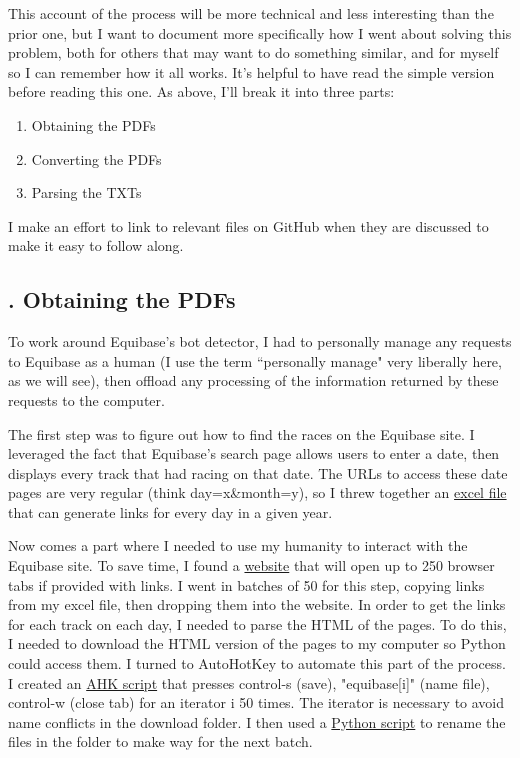 \documentclass{article}
\begin{document}
This account of the process will be more technical and less interesting than the prior one, but I want to document more specifically how I went about solving this problem, both for others that may want to do something similar, and for myself so I can remember how it all works. It's helpful to have read the simple version before reading this one. As above, I'll break it into three parts:

\begin{enumerate}
  \item Obtaining the PDFs
  \item Converting the PDFs
  \item Parsing the TXTs
\end{enumerate}

\noindent I make an effort to link to relevant files on GitHub when they are discussed to make it easy to follow along.

\subsection*{. Obtaining the PDFs}

To work around Equibase's bot detector, I had to personally manage any requests to Equibase as a human (I use the term ``personally manage" very liberally here, as we will see), then offload any processing of the information returned by these requests to the computer.

The first step was to figure out how to find the races on the Equibase site. I leveraged the fact that Equibase's search page allows users to enter a date, then displays every track that had racing on that date. The URLs to access these date pages are very regular (think day=x\&month=y), so I threw together an \href{https://github.com/Real-Karisch/horseData/blob/master/excel/generateDayLinks.xlsx}{excel file} that can generate links for every day in a given year.

Now comes a part where I needed to use my humanity to interact with the Equibase site. To save time, I found a \href{https://www.openmultipleurl.com/}{website} that will open up to 250 browser tabs if provided with links. I went in batches of 50 for this step, copying links from my excel file, then dropping them into the website. In order to get the links for each track on each day, I needed to parse the HTML of the pages. To do this, I needed to download the HTML version of the pages to my computer so Python could access them. I turned to AutoHotKey to automate this part of the process. I created an \href{https://github.com/Real-Karisch/horseData/blob/master/python/convertPDF/webScrape/saveHtmlHotkey.ahk}{AHK script} that presses control-s (save), "equibase[i]" (name file), control-w (close tab) for an iterator i 50 times. The iterator is necessary to avoid name conflicts in the download folder. I then used a \href{https://github.com/Real-Karisch/horseData/blob/master/python/convertPDF/webScrape/htmlMgmt.py}{Python script} to rename the files in the folder to make way for the next batch.
\end{document}
